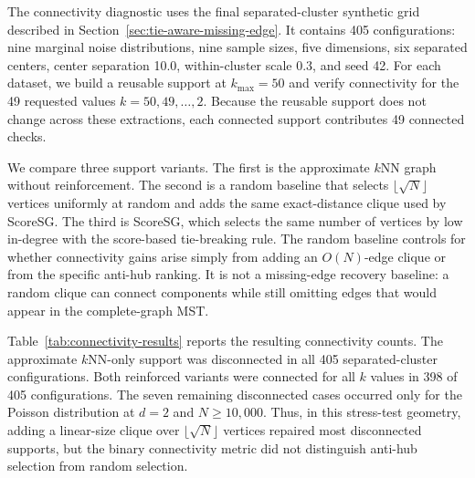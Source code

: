 \documentclass[11pt]{article}
\begin{document}
The connectivity diagnostic uses the final separated-cluster synthetic grid described in Section~\ref{sec:tie-aware-missing-edge}. It contains 405 configurations: nine marginal noise distributions, nine sample sizes, five dimensions, six separated centers, center separation 10.0, within-cluster scale 0.3, and seed 42. For each dataset, we build a reusable support at \(k_{\max}=50\) and verify connectivity for the 49 requested values \(k=50,49,\ldots,2\). Because the reusable support does not change across these extractions, each connected support contributes 49 connected checks.

We compare three support variants. The first is the approximate \(k\)NN graph without reinforcement. The second is a random baseline that selects \(\lfloor\sqrt{N}\rfloor\) vertices uniformly at random and adds the same exact-distance clique used by ScoreSG. The third is ScoreSG, which selects the same number of vertices by low in-degree with the score-based tie-breaking rule. The random baseline controls for whether connectivity gains arise simply from adding an \(O(N)\)-edge clique or from the specific anti-hub ranking. It is not a missing-edge recovery baseline: a random clique can connect components while still omitting edges that would appear in the complete-graph MST.

Table~\ref{tab:connectivity-results} reports the resulting connectivity counts. The approximate \(k\)NN-only support was disconnected in all 405 separated-cluster configurations. Both reinforced variants were connected for all \(k\) values in 398 of 405 configurations. The seven remaining disconnected cases occurred only for the Poisson distribution at \(d=2\) and \(N\geq 10{,}000\). Thus, in this stress-test geometry, adding a linear-size clique over \(\lfloor\sqrt{N}\rfloor\) vertices repaired most disconnected supports, but the binary connectivity metric did not distinguish anti-hub selection from random selection.

\begin{table}[H]
\centering
\caption{Connectivity diagnostics for reusable support graphs over \(k=50,\ldots,2\). The random baseline adds a clique over \(\lfloor\sqrt{N}\rfloor\) uniformly selected vertices; ScoreSG adds a clique over the same number of anti-hubs. Each connected configuration supports all 49 requested extractions.}
\label{tab:connectivity-results}
\end{table}
\end{document}
